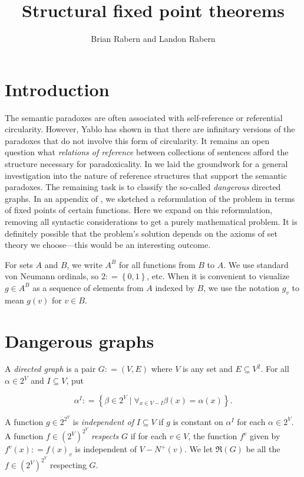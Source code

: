 \documentclass[12pt]{amsart}
\title{Structural fixed point theorems}
\author{Brian Rabern and Landon Rabern}
\theoremstyle{plain}
\theoremstyle{definition}
\theoremstyle{remark}
\newcommand{\R}{\mathfrak{R}}
\newcommand{\set}[1]{\left\{ #1 \right\}}
\newcommand{\setb}[3]{\left\{ #1 \in #2 \mid #3 \right\}}
\newcommand{\parens}[1]{\left( #1 \right)}
\newcommand{\DefinedAs}{\mathrel{\mathop:}=}
\begin{document}
\maketitle
\section{Introduction}
The semantic paradoxes are often associated with self-reference or referential circularity. However, Yablo has shown in \cite{yablo93} that there are infinitary versions of the paradoxes that do not involve this form of circularity. It remains an open question what \textit{relations of reference} between collections of sentences afford the structure necessary for paradoxicality. In \cite{danger} we laid the groundwork for a general investigation into the nature of reference structures that support the semantic paradoxes.  The remaining task is to classify the so-called \emph{dangerous} directed graphs.  In an appendix of \cite{danger}, we sketched a reformulation of the problem in terms of fixed points of certain functions.  Here we expand on this reformulation, removing all syntactic considerations to get a purely mathematical problem.  It is definitely possible that the problem's solution depends on the axioms of set theory we choose---this would be an interesting outcome.

For sets $A$ and $B$, we write $A^B$ for all functions from $B$ to $A$. We use standard von Neumann ordinals, so $2 \DefinedAs \set{0,1}$, etc.  When it is convenient to visualize $g \in A^B$ as a sequence of elements from $A$ indexed by $B$, we use the notation $g_v$ to mean $g(v)$ for $v \in B$. 

\section{Dangerous graphs}
A \emph{directed graph} is a pair $G \DefinedAs (V, E)$ where $V$ is any set and $E \subseteq V^2$. For all $\alpha \in 2^V$ and $I \subseteq V$, put

\[\alpha^I \DefinedAs \setb{\beta}{2^V}{\forall_{x \in V - I} \beta(x) = \alpha(x)}.\]

A function $g \in 2^{2^V}$ is \emph{independent of} $I \subseteq V$ if $g$ is constant on $\alpha^I$ for each $\alpha \in 2^V$. A function $f \in \parens{2^V}^{2^V}$ \emph{respects} $G$ if for each $v \in V$, the function $f^v$ given by $f^v(x) \DefinedAs f(x)_v$ is independent of $V - N^+(v)$.  We let $\R(G)$ be all the $f \in \parens{2^V}^{2^V}$ respecting $G$.
\end{document}
